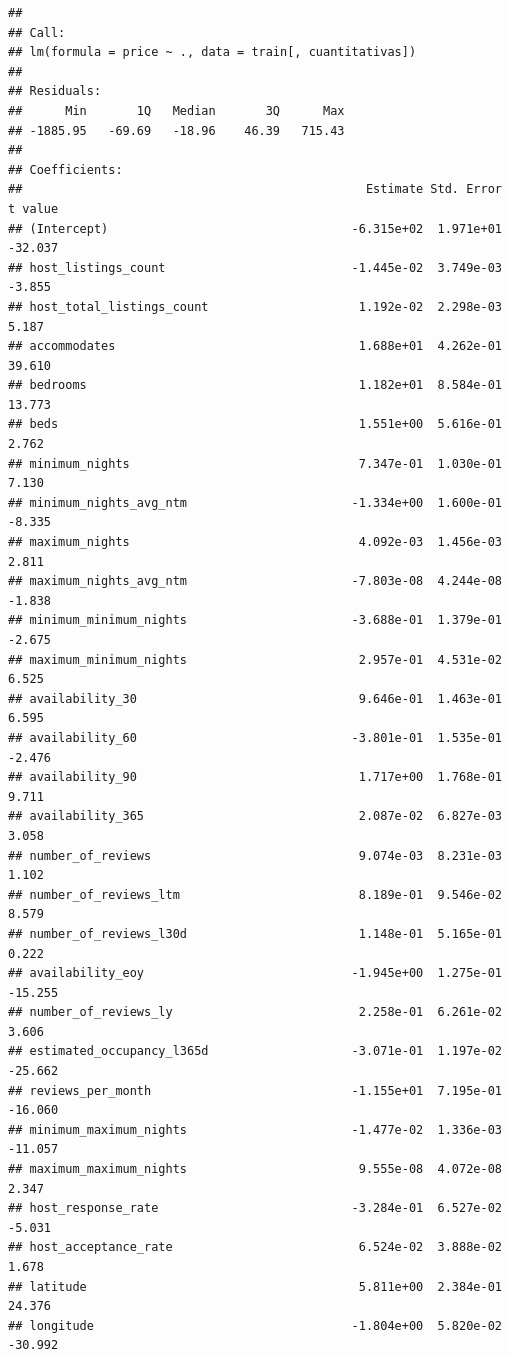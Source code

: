\documentclass[
]{article}
\begin{document}
\begin{verbatim}
## 
## Call:
## lm(formula = price ~ ., data = train[, cuantitativas])
## 
## Residuals:
##      Min       1Q   Median       3Q      Max 
## -1885.95   -69.69   -18.96    46.39   715.43 
## 
## Coefficients:
##                                                Estimate Std. Error t value
## (Intercept)                                  -6.315e+02  1.971e+01 -32.037
## host_listings_count                          -1.445e-02  3.749e-03  -3.855
## host_total_listings_count                     1.192e-02  2.298e-03   5.187
## accommodates                                  1.688e+01  4.262e-01  39.610
## bedrooms                                      1.182e+01  8.584e-01  13.773
## beds                                          1.551e+00  5.616e-01   2.762
## minimum_nights                                7.347e-01  1.030e-01   7.130
## minimum_nights_avg_ntm                       -1.334e+00  1.600e-01  -8.335
## maximum_nights                                4.092e-03  1.456e-03   2.811
## maximum_nights_avg_ntm                       -7.803e-08  4.244e-08  -1.838
## minimum_minimum_nights                       -3.688e-01  1.379e-01  -2.675
## maximum_minimum_nights                        2.957e-01  4.531e-02   6.525
## availability_30                               9.646e-01  1.463e-01   6.595
## availability_60                              -3.801e-01  1.535e-01  -2.476
## availability_90                               1.717e+00  1.768e-01   9.711
## availability_365                              2.087e-02  6.827e-03   3.058
## number_of_reviews                             9.074e-03  8.231e-03   1.102
## number_of_reviews_ltm                         8.189e-01  9.546e-02   8.579
## number_of_reviews_l30d                        1.148e-01  5.165e-01   0.222
## availability_eoy                             -1.945e+00  1.275e-01 -15.255
## number_of_reviews_ly                          2.258e-01  6.261e-02   3.606
## estimated_occupancy_l365d                    -3.071e-01  1.197e-02 -25.662
## reviews_per_month                            -1.155e+01  7.195e-01 -16.060
## minimum_maximum_nights                       -1.477e-02  1.336e-03 -11.057
## maximum_maximum_nights                        9.555e-08  4.072e-08   2.347
## host_response_rate                           -3.284e-01  6.527e-02  -5.031
## host_acceptance_rate                          6.524e-02  3.888e-02   1.678
## latitude                                      5.811e+00  2.384e-01  24.376
## longitude                                    -1.804e+00  5.820e-02 -30.992

\end{verbatim}
\end{document}

